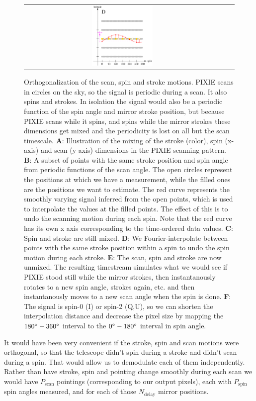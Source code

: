 \documentclass{article}
\begin{document}
\begin{figure}
\begin{tabular}{ccc}
		\includegraphics[width=0.32\textwidth]{plots/shift4.pdf}
	\end{tabular}
	\caption{Orthogonalization of the scan, spin and stroke
	motions. PIXIE scans in circles on the sky, so the
	signal is periodic during a scan. It also spins and strokes.
	In isolation the signal would also be a periodic function
	of the spin angle and mirror stroke position, but because
	PIXIE scans while it spins, and spins
	while the mirror strokes these dimensions get mixed and the
	periodicity is lost on all but the scan timescale.
	\textbf{A}: Illustration of the mixing of the stroke (color),
	spin (x-axis) and scan (y-axis) dimensions in the PIXIE scanning
	pattern. \textbf{B}: A subset of points with the same stroke
	position and spin angle from periodic functions of the scan
	angle. The open circles represent the positions at which
	we have a measurement, while the filled ones are the positions
	we want to estimate. The red curve represents the smoothly
	varying signal inferred from the open points, which is used to
	interpolate the values at the filled points. The effect of
	this is to undo the scanning motion during each spin.
	Note that the red curve has its own x axis corresponding
	to the time-ordered data values.
	\textbf{C}: Spin and stroke are still
	mixed. \textbf{D}: We Fourier-interpolate between points with
	the same stroke position within a spin to undo the spin
	motion during each stroke. \textbf{E}: The scan, spin and stroke
	are now unmixed. The resulting timestream simulates what we would
	see if PIXIE stood still while the mirror strokes, then
	instantanously rotates to a new spin angle, strokes again, etc.
	and then instantanously moves to a new scan angle when the spin is done.
	\textbf{F}: The signal is spin-0 (I) or spin-2 (Q,U), so we can
	shorten the interpolation distance and decrease the pixel size
	by mapping the $180\degree-360\degree$ interval to the $0\degree-
	180\degree$ interval in spin angle.}
	\label{fig:ortho}
\end{figure}
It would have been very convenient if the stroke, spin and scan motions were
orthogonal, so that the telescope didn't spin during a stroke and didn't scan
during a spin. That would allow us to demodulate each of them independently.
Rather than have stroke, spin and pointing change smoothly during each scan
we would have $P_\textrm{scan}$ pointings (corresponding
to our output pixels), each with
$P_\textrm{spin}$ spin angles measured, and for each
of those $N_\textrm{delay}$ mirror positions.
\end{document}
